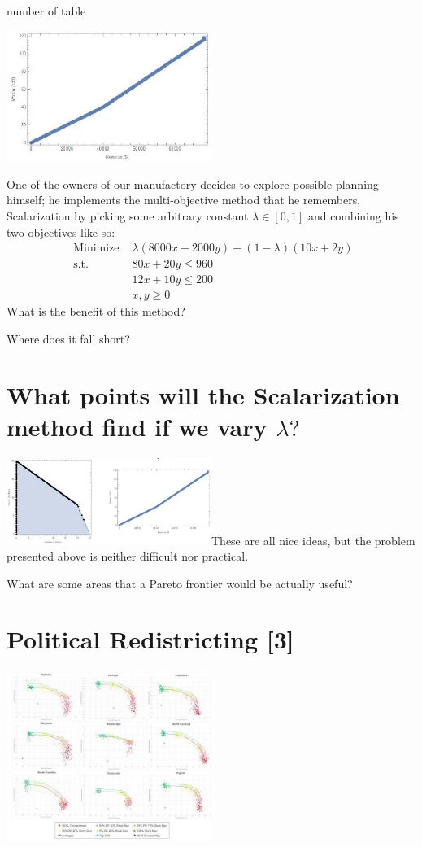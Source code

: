 number of table

\includegraphics[width=0.5\textwidth]{optimization/multi-objective/images/2022_02_28_634e8079070800ac7e3cg-15(1)}

One of the owners of our manufactory decides to explore possible planning himself; he implements the multi-objective method that he remembers, Scalarization by picking some arbitrary constant $\lambda \in[0,1]$ and combining his two objectives like so:
$$
\begin{array}{cl}
\text { Minimize } & \lambda(8000 x+2000 y)+(1-\lambda)(10 x+2 y) \\
\text { s.t. } & 80 x+20 y \leq 960 \\
& 12 x+10 y \leq 200 \\
& x, y \geq 0
\end{array}
$$
What is the benefit of this method?

Where does it fall short?

\section{What points will the Scalarization method find if we vary $\lambda ?$}
\includegraphics[width=0.5\textwidth]{optimization/multi-objective/images/2022_02_28_634e8079070800ac7e3cg-17}These are all nice ideas, but the problem presented above is neither difficult nor practical.

What are some areas that a Pareto frontier would be actually useful?

\section{Political Redistricting [3]}
\includegraphics[width=0.5\textwidth]{optimization/multi-objective/images/2022_02_28_634e8079070800ac7e3cg-19}

